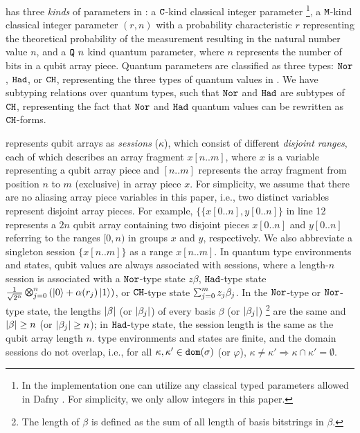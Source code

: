 \qafny has three \emph{kinds} of parameters in : a $\texttt{C}$-kind classical integer parameter \footnote{In the \qafny implementation one can utilize any classical typed parameters allowed in Dafny . For simplicity, we only allow integers in this paper.}, a $\texttt{M}$-kind classical integer parameter $(r,n)$ with a probability characteristic $r$ representing the theoretical probability of the measurement resulting in the natural number value $n$, and a $\texttt{Q}~n$ kind quantum parameter, where $n$ represents the number of bits in a qubit array piece. Quantum parameters are classified as three types: $\texttt{Nor}$, $\texttt{Had}$, or $\texttt{CH}$, representing the three types of quantum values in . We have subtyping relations over quantum types, such that $\texttt{Nor}$ and $\texttt{Had}$ are subtypes of $\texttt{CH}$, representing the fact that $\texttt{Nor}$ and $\texttt{Had}$ quantum values can be rewritten as $\texttt{CH}$-forms. 

\qafny represents qubit arrays as \emph{sessions} ($\kappa$), which consist of different \emph{disjoint ranges}, each of which describes an array fragment $x[n..m]$, where $x$ is a variable representing a qubit array piece and $[n..m]$ represents the array fragment from position $n$ to $m$ (exclusive) in array piece $x$. For simplicity, we assume that there are no aliasing array piece variables in this paper, i.e., two distinct variables represent disjoint array pieces. For example, $\{\{x[0..n],y[0..n]\}$ in  line 12 represents a $2n$ qubit array containing two disjoint pieces $x[0..n]$ and $y[0..n]$ referring to the ranges $[0,n)$ in groups $x$ and $y$, respectively. We also abbreviate a singleton session $\{x[n..m]\}$ as a range $x[n..m]$.
In \qafny quantum type environments and states, qubit values are always associated with sessions, where a length-$n$ session is associated with a $\texttt{Nor}$-type state $z\beta$, $\texttt{Had}$-type state $\shad{2^n}{n}{\alpha(r_j)}$, or $\texttt{CH}$-type state $\ssum{j=0}{m}{z_j\beta_j}$. In the $\texttt{Nor}$-type or $\texttt{Nor}$-type state, the lengths $|\beta|$ (or $|\beta_j|$) of every basis $\beta$ (or $|\beta_j|$) \footnote{The length of $\beta$ is defined as the sum of all length of basis bitstrings in $\beta$.} are the same and $|\beta| \ge n$ (or $|\beta_j| \ge n$); in $\texttt{Had}$-type state, the session length is the same as the qubit array length $n$.
\qafny type environments and states are finite, and the domain sessions do not overlap, i.e., for all $\kappa, \kappa' \in \mathtt{dom}(\sigma)$ (or $\varphi$), $\kappa \neq \kappa' \Rightarrow \kappa \cap \kappa' = \emptyset$.

